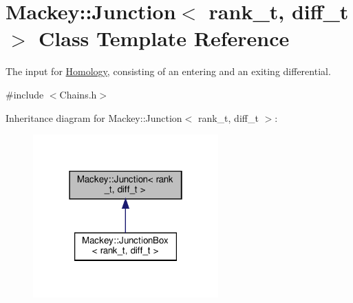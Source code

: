 \hypertarget{classMackey_1_1Junction}{}\section{Mackey\+:\+:Junction$<$ rank\+\_\+t, diff\+\_\+t $>$ Class Template Reference}
\label{classMackey_1_1Junction}


The input for \hyperlink{classMackey_1_1Homology}{Homology}, consisting of an entering and an exiting differential.  




{\ttfamily \#include $<$Chains.\+h$>$}



Inheritance diagram for Mackey\+:\+:Junction$<$ rank\+\_\+t, diff\+\_\+t $>$\+:\nopagebreak
\begin{figure}[H]
\begin{center}
\leavevmode
\includegraphics[width=202pt]{classMackey_1_1Junction__inherit__graph}
\end{center}
\end{figure}
